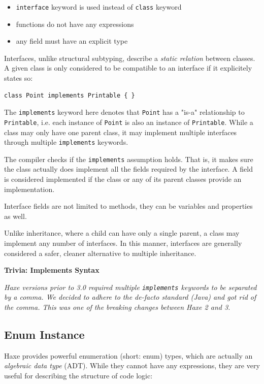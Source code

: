 \documentclass{article}
\newcommand{\type}[1]{\texttt{#1}}
\newcommand{\expr}[1]{\texttt{#1}}
\newenvironment{myshaded}
  {\def\FrameCommand{\fboxsep=\topsep\colorbox{bgcolor}}%
  \MakeFramed {\advance\hsize-\width \FrameRestore}}%
 {\endMakeFramed}
\newcommand{\trivia}[2]
	{\begin{myshaded}\noindent\textbf{Trivia: #1}\par\nobreak\noindent\ignorespaces\textit{#2}\end{myshaded}}
\begin{document}
\begin{itemize}
	\item \expr{interface} keyword is used instead of \expr{class} keyword
	\item functions do not have any expressions
	\item any field must have an explicit type
\end{itemize}
Interfaces, unlike structural subtyping, describe a \emph{static relation} between classes. A given class is only considered to be compatible to an interface if it explicitely states so:

\begin{lstlisting}
class Point implements Printable { }
\end{lstlisting}
The \expr{implements} keyword here denotes that \type{Point} has a "is-a" relationship to \type{Printable}, i.e. each instance of \type{Point} is also an instance of \type{Printable}. While a class may only have one parent class, it may implement multiple interfaces through multiple \expr{implements} keywords.

The compiler checks if the \expr{implements} assumption holds. That is, it makes sure the class actually does implement all the fields required by the interface. A field is considered implemented if the class or any of its parent classes provide an implementation.

Interface fields are not limited to methods, they can be variables and properties as well.

Unlike inheritance, where a child can have only a single parent, a class may implement any number of interfaces.  In this manner, interfaces are generally considered a safer, cleaner alternative to multiple inheritance.

\trivia{Implements Syntax}{Haxe versions prior to 3.0 required multiple \expr{implements} keywords to be separated by a comma. We decided to adhere to the de-facto standard (Java)  and got rid of the comma. This was one of the breaking changes between Haxe 2 and 3.}


\subsection{Enum Instance}
\label{Enum Instance}

Haxe provides powerful enumeration (short: enum) types, which are actually an \emph{algebraic data type} (ADT). While they cannot have any expressions, they are very useful for describing the structure of code logic:
\end{document}
